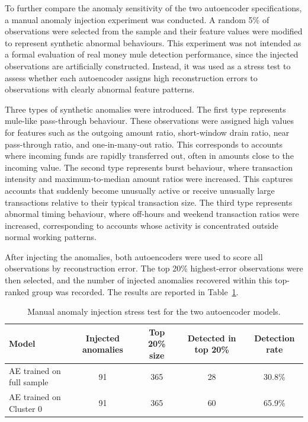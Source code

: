 To further compare the anomaly sensitivity of the two autoencoder specifications, a manual anomaly injection experiment was conducted. A random 5\% of observations were selected from the sample and their feature values were modified to represent synthetic abnormal behaviours. This experiment was not intended as a formal evaluation of real money mule detection performance, since the injected observations are artificially constructed. Instead, it was used as a stress test to assess whether each autoencoder assigns high reconstruction errors to observations with clearly abnormal feature patterns.

Three types of synthetic anomalies were introduced. The first type represents mule-like pass-through behaviour. These observations were assigned high values for features such as the outgoing amount ratio, short-window drain ratio, near pass-through ratio, and one-in-many-out ratio. This corresponds to accounts where incoming funds are rapidly transferred out, often in amounts close to the incoming value. The second type represents burst behaviour, where transaction intensity and maximum-to-median amount ratios were increased. This captures accounts that suddenly become unusually active or receive unusually large transactions relative to their typical transaction size. The third type represents abnormal timing behaviour, where off-hours and weekend transaction ratios were increased, corresponding to accounts whose activity is concentrated outside normal working patterns.

After injecting the anomalies, both autoencoders were used to score all observations by reconstruction error. The top 20\% highest-error observations were then selected, and the number of injected anomalies recovered within this top-ranked group was recorded. The results are reported in Table~\ref{tab:ae_injection_test}.

\begin{table}[H]
\centering
\begin{tabular}{lcccc}
\hline
Model & Injected anomalies & Top 20\% size & Detected in top 20\% & Detection rate \\
\hline
AE trained on full sample & 91 & 365 & 28 & 30.8\% \\
AE trained on Cluster 0 & 91 & 365 & 60 & 65.9\% \\
\hline
\end{tabular}
\caption{Manual anomaly injection stress test for the two autoencoder models.}
\label{tab:ae_injection_test}
\end{table}

